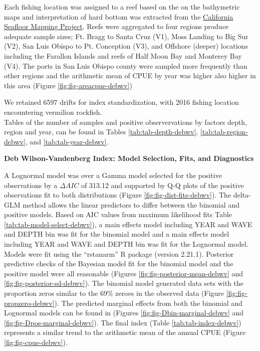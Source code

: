 \documentclass[11pt,
  english,
]{article}
\begin{document}
Each fishing location was assigned to a reef based on the on the bathymetric maps and interpretation of hard bottom was extracted from the {\href{http://seafloor.otterlabs.org/index.html}{California Seafloor Mapping Project}\leavevmode\tagmcend\tagstructend}. Reefs were aggregated to four regions produce adequate sample sizes; Ft. Bragg to Santa Cruz (V1), Moss Landing to Big Sur (V2), San Luis Obispo to Pt. Conception (V3), and Offshore (deeper) locations including the Farallon Islands and reefs of Half Moon Bay and Monterey Bay (V4). The ports in San Luis Obispo county were sampled more frequently than other regions and the arithmetic mean of CPUE by year was higher also higher in this area (Figure \ref{fig:fig-areacpue-debwv})

We retained 6597 drifts for index standardization, with 2016 fishing location encountering vermilion rockfish.\\
Tables of the number of samples and positive observervations by factors depth, region and year, can be found in Tables \ref{tab:tab-depth-debwv}, \ref{tab:tab-region-debwv}, and \ref{tab:tab-year-debwv}.

\textbf{Deb Wilson-Vandenberg Index: Model Selection, Fits, and Diagnostics}

A Lognormal model was over a Gamma model selected for the positive observations by a {\(\Delta AIC\)\leavevmode\tagmcend\tagstructend} of 313.12 and supported by Q-Q plots of the positive observations fit to both distributions (Figure \ref{fig:fig-dist-fits-debwv}). The delta-GLM method allows the linear predictors to differ between the binomial and positive models. Based on AIC values from maximum likelihood fits Table \ref{tab:tab-model-select-debwv}), a main effects model including YEAR and WAVE and DEPTH bin was fit for the binomial model and a main effects model including YEAR and WAVE and DEPTH bin was fit for the Lognormal model. Models were fit using the ``rstanarm'' R package (version 2.21.1). Posterior predictive checks of the Bayesian model fit for the binomial model and the positive model were all reasonable (Figures \ref{fig:fig-posterior-mean-debwv} and \ref{fig:fig-posterior-sd-debwv}). The binomial model generated data sets with the proportion zeros similar to the 69\% zeroes in the observed data (Figure \ref{fig:fig-propzero-debwv}). The predicted marginal effects from both the binomial and Lognormal models can be found in (Figures \ref{fig:fig-Dbin-marginal-debwv} and \ref{fig:fig-Dpos-marginal-debwv}). The final index (Table \ref{tab:tab-index-debwv}) represents a similar trend to the arithmetic mean of the annual CPUE (Figure \ref{fig:fig-cpue-debwv}).
\end{document}
